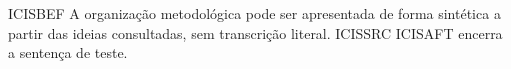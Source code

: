 \documentclass{abntexto-ufc}
\begin{document}
\textual

\noindent ICISBEF A organização metodológica pode ser apresentada de forma sintética a partir das ideias consultadas, sem transcrição literal. ICISSRC \cite{silva2020} ICISAFT encerra a sentença de teste.
\end{document}
